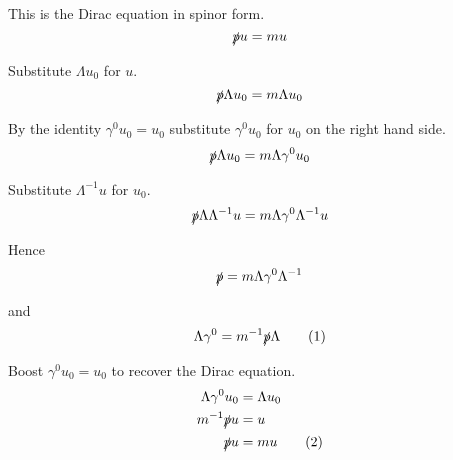 This is the Dirac equation in spinor form.
\begin{equation*}
\slashed pu=mu
\end{equation*}

Substitute $\Lambda u_0$ for $u$.
\begin{equation*}
\slashed p\Lambda u_0=m\Lambda u_0
\end{equation*}

By the identity $\gamma^0u_0=u_0$ substitute $\gamma^0u_0$ for $u_0$ on the right hand side.
\begin{equation*}
\slashed p\Lambda u_0=m\Lambda\gamma^0u_0
\end{equation*}

Substitute $\Lambda^{-1}u$ for $u_0$.
\begin{equation*}
\slashed p\Lambda\Lambda^{-1}u=m\Lambda\gamma^0\Lambda^{-1}u
\end{equation*}

Hence
\begin{equation*}
\slashed p=m\Lambda\gamma^0\Lambda^{-1}
\end{equation*}

and
\begin{equation*}
\Lambda\gamma^0=m^{-1}\slashed p\Lambda
\tag{1}
\end{equation*}

Boost $\gamma^0u_0=u_0$ to recover the Dirac equation.
\begin{align*}
\Lambda\gamma^0u_0&=\Lambda u_0
\\
m^{-1}\slashed pu&=u
\\
\slashed pu&=mu
\tag{2}
\end{align*}


